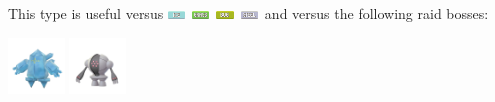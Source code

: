 \documentclass[12pt]{beamer}
\newcommand{\bugfull}{\includegraphics[height=0.2cm]{../../images/type/full/Bug.png}}
\newcommand{\grassfull}{\includegraphics[height=0.2cm]{../../images/type/full/Grass.png}}
\newcommand{\icefull}{\includegraphics[height=0.2cm]{../../images/type/full/Ice.png}}
\newcommand{\steelfull}{\includegraphics[height=0.2cm]{../../images/type/full/Steel.png}}
\begin{document}
\begin{frame}[label=Fire]
\begin{footnotesize}
\begin{block}{}\begin{center}
This type is useful versus \icefull~\grassfull~\bugfull~\steelfull~and versus the following raid bosses:

    \includegraphics[width=1.5cm]{../../images/pokemon/regice}
    \includegraphics[width=1.5cm]{../../images/pokemon/registeel}
\end{center}
\end{block}

\end{footnotesize}
\end{frame}



\end{document}
